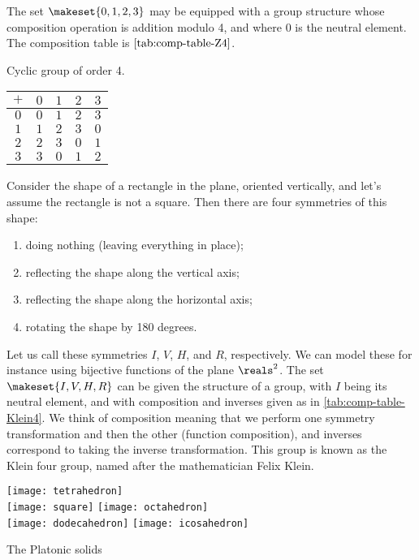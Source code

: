 \begin{example}
    \label{exa:grp-Z4}
The set $\makeset{0, 1, 2, 3 }$ may be equipped with a group structure whose composition operation is addition modulo 4, and where $0$ is the neutral element. The composition table is $\cref{tab:comp-table-Z4}$.
    \begin{margintable}
    \caption{Cyclic group of order 4.}
    \label{tab:comp-table-Z4}
    \centering
    \begin{tabular}{c|cccc}
        $+$ & $0$ & $1$ & $2$ & $3$ \\
        \hline
        $0$ & $0$ & $1$ & $2$ & $3$ \\
        $1$ & $1$ & $2$ & $3$ & $0$ \\
        $2$ & $2$ & $3$ & $0$ & $1$ \\
        $3$ & $3$ & $0$ & $1$ & $2$
    \end{tabular}
\end{margintable}
\end{example}


\begin{example}
\label{exa:grp-Klein4}
Consider the shape of a rectangle in the plane, oriented vertically, and let's assume the rectangle is not a square. Then there are four symmetries of this shape:
\begin{enumerate}
\item doing nothing (leaving everything in place);
\item reflecting the shape along the vertical axis;
\item reflecting the shape along the horizontal axis;
\item rotating the shape by 180 degrees.
\end{enumerate}
Let us call these symmetries $I$, $V$, $H$, and $R$, respectively. We can model these for instance using bijective functions of the plane $\reals^2$. The set $\makeset{I, V, H, R}$ can be given the structure of a group, with $I$ being its neutral element, and with composition and inverses given as in \cref{tab:comp-table-Klein4}. We think of composition meaning that we perform one symmetry transformation and then the other (function composition), and inverses correspond to taking the inverse transformation. This group is known as the Klein four group, named after the mathematician Felix Klein.
\end{example}

\begin{marginfigure}
\centering
\texttt{[image: tetrahedron]} \\
\texttt{[image: square]} 
\texttt{[image: octahedron]} \\
\texttt{[image: dodecahedron]} 
\texttt{[image: icosahedron]} 
    \caption{The Platonic solids}
    \label{fig:platonic-solids}
\end{marginfigure}

